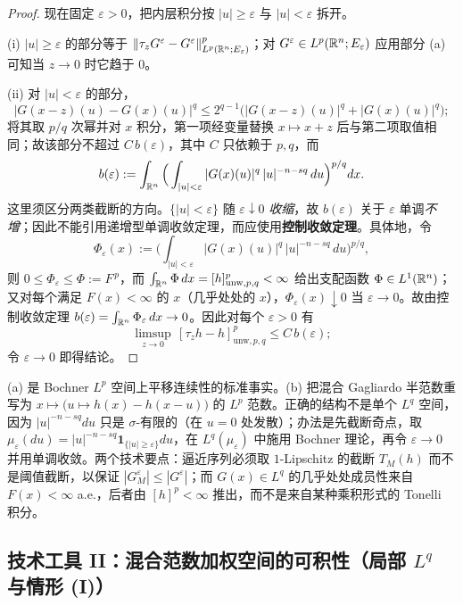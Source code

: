 \begin{proof}
现在固定 $\varepsilon>0$，把内层积分按 $|u|\ge\varepsilon$ 与 $|u|<\varepsilon$ 拆开。

(i) $|u|\ge\varepsilon$ 的部分等于 $\|\tau_zG^\varepsilon-G^\varepsilon\|_{L^p(\mathbb{R}^n;E_\varepsilon)}^p$；对 $G^\varepsilon\in L^p(\mathbb{R}^n;E_\varepsilon)$ 应用部分 (a) 可知当 $z\to0$ 时它趋于 $0$。

(ii) 对 $|u|<\varepsilon$ 的部分，
\[
  |G(x-z)(u)-G(x)(u)|^q\le2^{q-1}\big(|G(x-z)(u)|^q+|G(x)(u)|^q\big);
\]
将其取 $p/q$ 次幂并对 $x$ 积分，第一项经变量替换 $x\mapsto x+z$ 后与第二项取值相同；故该部分不超过 $C\,b(\varepsilon)$，其中 $C$ 只依赖于 $p,q$，而
\[
  b(\varepsilon):=\int_{\mathbb{R}^n}\Big(\int_{|u|<\varepsilon}|G(x)(u)|^q\,|u|^{-n-sq}\,du\Big)^{p/q}dx .
\]
这里须区分两类截断的方向。$\{|u|<\varepsilon\}$ 随 $\varepsilon\downarrow0$ \emph{收缩}，故 $b(\varepsilon)$ 关于 $\varepsilon$ 单调\emph{不增}；因此不能引用递增型单调收敛定理，而应使用\textbf{控制收敛定理}。具体地，令
\[
  \Phi_\varepsilon(x):=\Big(\int_{|u|<\varepsilon}|G(x)(u)|^q\,|u|^{-n-sq}\,du\Big)^{p/q},
\]
则 $0\le\Phi_\varepsilon\le\Phi:=F^{\,p}$，而 $\int_{\mathbb{R}^n}\Phi\,dx=[h]_{\mathrm{unw},p,q}^p<\infty$ 给出支配函数 $\Phi\in L^1(\mathbb{R}^n)$；又对每个满足 $F(x)<\infty$ 的 $x$（几乎处处的 $x$），$\Phi_\varepsilon(x)\downarrow0$ 当 $\varepsilon\to0$。故由控制收敛定理 $b(\varepsilon)=\int_{\mathbb{R}^n}\Phi_\varepsilon\,dx\to0$。因此对每个 $\varepsilon>0$ 有
\[
  \limsup_{z\to0}\,[\tau_zh-h]_{\mathrm{unw},p,q}^p\le C\,b(\varepsilon);
\]
令 $\varepsilon\to0$ 即得结论。
\end{proof}

\begin{remark}[直觉]
(a) 是 Bochner $L^p$ 空间上平移连续性的标准事实。(b) 把混合 Gagliardo 半范数重写为 $x\mapsto\big(u\mapsto h(x)-h(x-u)\big)$ 的 $L^p$ 范数。正确的结构不是单个 $L^q$ 空间，因为 $|u|^{-n-sq}du$ 只是 $\sigma$-有限的（在 $u=0$ 处发散）；办法是先截断奇点，取 $\mu_\varepsilon(du)=|u|^{-n-sq}\mathbf{1}_{\{|u|\ge\varepsilon\}}du$，在 $L^q(\mu_\varepsilon)$ 中施用 Bochner 理论，再令 $\varepsilon\to0$ 并用单调收敛。两个技术要点：逼近序列必须取 $1$-Lipschitz 的截断 $T_M(h)$ 而不是阈值截断，以保证 $|G^\varepsilon_M|\le|G^\varepsilon|$；而 $G(x)\in L^q$ 的几乎处处成员性来自 $F(x)<\infty$ a.e.，后者由 $[h]^p<\infty$ 推出，而不是来自某种乘积形式的 Tonelli 积分。
\end{remark}

\subsection{技术工具 II：混合范数加权空间的可积性（局部 \texorpdfstring{$L^q$}{Lq} 与情形 (I)）}

